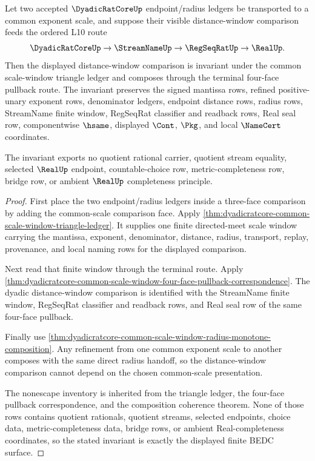 \begin{theorem}
\label{thm:dyadicratcore-common-scale-distance-window}
Let two accepted $\DyadicRatCoreUp$ endpoint/radius ledgers be transported to a common exponent scale, and suppose their visible distance-window comparison feeds the ordered L10 route
$$
\DyadicRatCoreUp \to \StreamNameUp \to \RegSeqRatUp \to \RealUp .
$$
Then the displayed distance-window comparison is invariant under the common scale-window triangle ledger and composes through the terminal four-face pullback route. The invariant preserves the signed mantissa rows, refined positive-unary exponent rows, denominator ledgers, endpoint distance rows, radius rows, StreamName finite window, RegSeqRat classifier and readback rows, Real seal row, componentwise $\hsame$, displayed $\Cont$, $\Pkg$, and local $\NameCert$ coordinates.

The invariant exports no quotient rational carrier, quotient stream equality, selected $\RealUp$ endpoint, countable-choice row, metric-completeness row, bridge row, or ambient $\RealUp$ completeness principle.
\end{theorem}
\begin{proof}
First place the two endpoint/radius ledgers inside a three-face comparison by adding the common-scale comparison face. Apply \autoref{thm:dyadicratcore-common-scale-window-triangle-ledger}. It supplies one finite directed-meet scale window carrying the mantissa, exponent, denominator, distance, radius, transport, replay, provenance, and local naming rows for the displayed comparison.

Next read that finite window through the terminal route. Apply \autoref{thm:dyadicratcore-common-scale-window-four-face-pullback-correspondence}. The dyadic distance-window comparison is identified with the StreamName finite window, RegSeqRat classifier and readback rows, and Real seal row of the same four-face pullback.

Finally use \autoref{thm:dyadicratcore-common-scale-window-radius-monotone-composition}. Any refinement from one common exponent scale to another composes with the same direct radius handoff, so the distance-window comparison cannot depend on the chosen common-scale presentation.

The nonescape inventory is inherited from the triangle ledger, the four-face pullback correspondence, and the composition coherence theorem. None of those rows contains quotient rationals, quotient streams, selected endpoints, choice data, metric-completeness data, bridge rows, or ambient Real-completeness coordinates, so the stated invariant is exactly the displayed finite BEDC surface.
\end{proof}

